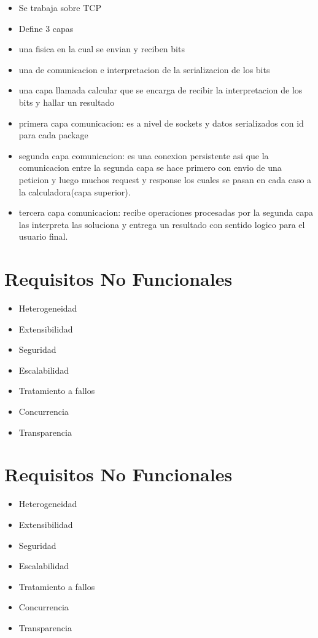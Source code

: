 \documentclass[12pt]{article}
\begin{document}
\begin{itemize}
  \item Se trabaja sobre TCP
  \item Define 3 capas
  \item una fisica en la cual se envian y reciben bits
  \item una de comunicacion e interpretacion de la serializacion de los bits
  \item una capa llamada calcular que se encarga de recibir la interpretacion de los bits y hallar un resultado
  \item primera capa comunicacion: es a nivel de sockets y datos serializados con id para cada package
  \item segunda capa comunicacion: es una conexion persistente asi que la comunicacion entre la segunda capa se hace primero con envio de una peticion y luego muchos request
  y response los cuales se pasan en cada caso a la calculadora(capa superior).
  \item tercera capa comunicacion: recibe operaciones procesadas por la segunda capa las interpreta las soluciona y entrega un resultado con sentido logico para el usuario final.
\end{itemize}

\section{Requisitos No Funcionales}
\begin{itemize}
  \item Heterogeneidad
  \item Extensibilidad
  \item Seguridad
  \item Escalabilidad
  \item Tratamiento a fallos
  \item Concurrencia
  \item Transparencia
\end{itemize}

\section{Requisitos No Funcionales}
\begin{itemize}
  \item Heterogeneidad
  \item Extensibilidad
  \item Seguridad
  \item Escalabilidad
  \item Tratamiento a fallos
  \item Concurrencia
  \item Transparencia
\end{itemize}
\end{document}

